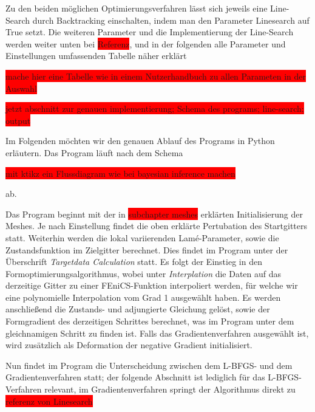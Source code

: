 Zu den beiden möglichen Optimierungsverfahren lässt sich jeweils eine Line-Search durch Backtracking einschalten, indem man den Parameter \textsf{Linesearch} auf \textsf{True} setzt. Die weiteren Parameter und die Implementierung der Line-Search werden weiter unten bei \colorbox{red}{Referenz}, und in der folgenden alle Parameter und Einstellungen umfassenden Tabelle näher erklärt

\colorbox{red}{mache hier eine Tabelle wie in einem Nutzerhandbuch zu allen Parameten in der Auswahl}


\colorbox{red}{jetzt abschnitt zur genauen implementierung; Schema des programs; line-search; output}

Im Folgenden möchten wir den genauen Ablauf des Programs in Python erläutern. 
Das Program läuft nach dem Schema

\colorbox{red}{mit ktikz ein Flussdiagram wie bei bayesian inference machen}


ab. 

Das Program beginnt mit der in \colorbox{red}{subchapter meshes} erklärten Initialisierung der Meshes. Je nach Einstellung findet die oben erklärte Pertubation des Startgitters statt. Weiterhin werden die lokal variierenden Lamé-Parameter, sowie die Zustandsfunktion im Zielgitter berechnet. Dies findet im Program unter der Überschrift \textit{Targetdata Calculation} statt. Es folgt der Einstieg in den Formoptimierungsalgorithmus, wobei unter \textit{Interplation} die Daten auf das derzeitige Gitter zu einer FEniCS-Funktion interpoliert werden, für welche wir eine polynomielle Interpolation vom Grad 1 ausgewählt haben. Es werden anschließend die Zustands- und adjungierte Gleichung gelöst, sowie der Formgradient des derzeitigen Schrittes berechnet, was im Program unter dem gleichnamigen Schritt zu finden ist. Falls das Gradientenverfahren ausgewählt ist, wird zusätzlich als Deformation der negative Gradient initialisiert. 

Nun findet im Program die Unterscheidung zwischen dem L-BFGS- und dem Gradientenverfahren statt; der folgende Abschnitt ist lediglich für das L-BFGS-Verfahren relevant, im Gradientenverfahren springt der Algorithmus direkt zu \colorbox{red}{referenz von Linesearch}

